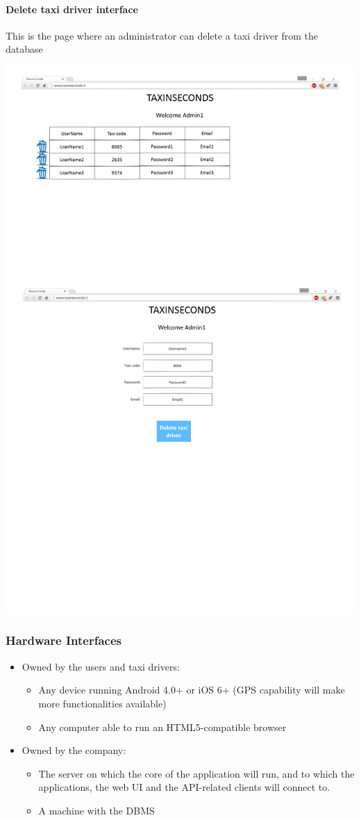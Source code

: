 \documentclass{article}
\begin{document}
\paragraph{Delete taxi driver interface}
This is the page where an administrator can delete a taxi driver from the database\\ 
\begin{center}
	\includegraphics[width=.8\textwidth,height=.8\textheight,keepaspectratio]{deletetaxidriver}
\end{center}
\clearpage
\subsubsection{Hardware Interfaces}
\begin{itemize}
	\item Owned by the users and taxi drivers:
		\begin{itemize}
			\item Any device running Android 4.0+ or iOS 6+ (GPS capability will make more functionalities available)
			\item Any computer able to run an HTML5-compatible browser 
		\end{itemize}
	\item Owned by the company:
		\begin{itemize}
			\item The server on which the core of the application will run, and to which the applications, 
				the web UI and the API-related clients will connect to.
			\item A machine with the DBMS 
		\end{itemize}
\end{itemize}
\end{document}

